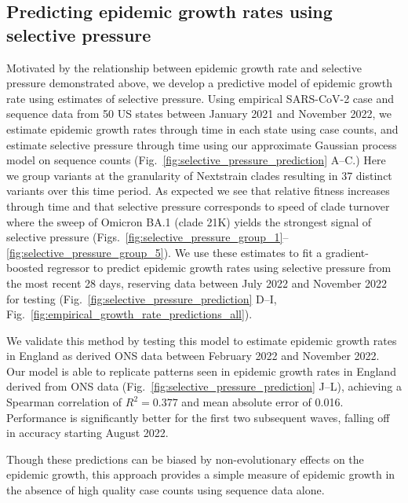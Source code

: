 \documentclass[11pt,oneside,letterpaper]{article}
\def\tbc#1{\textcolor{purple}{[#1]}}
\begin{document}
\subsection*{Predicting epidemic growth rates using selective pressure}

Motivated by the relationship between epidemic growth rate and selective pressure demonstrated above, we develop a predictive model of epidemic growth rate using estimates of selective pressure.
Using empirical SARS-CoV-2 case and sequence data from 50 US states between January 2021 and November 2022, we estimate epidemic growth rates through time in each state using case counts, and estimate selective pressure through time using our approximate Gaussian process model on sequence counts  (Fig.~\ref{fig:selective_pressure_prediction} A--C.)
Here we group variants at the granularity of Nextstrain clades \cite{aksamentov2021nextclade} resulting in 37 distinct variants over this time period.
As expected we see that relative fitness increases through time and that selective pressure corresponds to speed of clade turnover where the sweep of Omicron BA.1 (clade 21K) yields the strongest signal of selective pressure (Figs.~\ref{fig:selective_pressure_group_1}--\ref{fig:selective_pressure_group_5}).
We use these estimates to fit a gradient-boosted regressor to predict epidemic growth rates using selective pressure from the most recent 28 days, reserving data between July 2022 and November 2022 for testing (Fig.~\ref{fig:selective_pressure_prediction} D--I, Fig.~\ref{fig:empirical_growth_rate_predictions_all}).

We validate this method by testing this model to estimate epidemic growth rates in England as derived ONS data between February 2022 and November 2022.
Our model is able to replicate patterns seen in epidemic growth rates in England derived from ONS data (Fig.~\ref{fig:selective_pressure_prediction} J--L), achieving a Spearman correlation of $R^2 = 0.377$ and mean absolute error of 0.016.
Performance is significantly better for the first two subsequent waves, falling off in accuracy starting August 2022.

Though these predictions can be biased by non-evolutionary effects on the epidemic growth, this approach provides a simple measure of epidemic growth in the absence of high quality case counts using sequence data alone.
\end{document}
